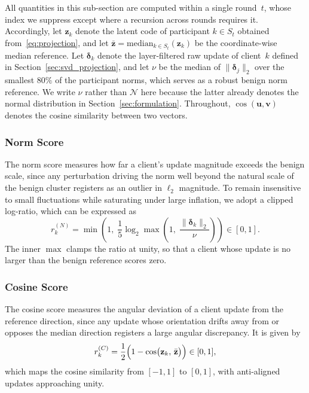 \documentclass[journal]{IEEEtran}
\begin{document}
All quantities in this sub-section are computed within a single round~$t$, whose index we suppress except where a recursion across rounds requires it. Accordingly, let $\mathbf{z}_k$ denote the latent code of participant $k \in S_t$ obtained from~\eqref{eq:projection}, and let $\bar{\mathbf{z}} = \mathrm{median}_{k \in S_t}(\mathbf{z}_k)$ be the coordinate-wise median reference. Let $\boldsymbol{\delta}_k$ denote the layer-filtered raw update of client~$k$ defined in Section~\ref{sec:svd_projection}, and let $\nu$ be the median of $\|\boldsymbol{\delta}_j\|_2$ over the smallest $80\%$ of the participant norms, which serves as a robust benign norm reference. We write $\nu$ rather than $\mathcal{N}$ here because the latter already denotes the normal distribution in Section~\ref{sec:formulation}. Throughout, $\cos(\mathbf{u},\mathbf{v})$ denotes the cosine similarity between two vectors.

\subsubsection{Norm Score}
The norm score measures how far a client's update magnitude exceeds the benign scale, since any perturbation driving the norm well beyond the natural scale of the benign cluster registers as an outlier in $\ell_2$ magnitude. To remain insensitive to small fluctuations while saturating under large inflation, we adopt a clipped log-ratio, which can be expressed as
\begin{equation}
r_k^{(N)} = \min\!\left(1,\; \frac{1}{5}\log_2 \max\!\left(1,\; \frac{\|\boldsymbol{\delta}_k\|_2}{\nu}\right)\right) \in [0,1].
\label{eq:norm_score}
\end{equation}
The inner $\max$ clamps the ratio at unity, so that a client whose update is no larger than the benign reference scores zero.

\subsubsection{Cosine Score}
The cosine score measures the angular deviation of a client update from the reference direction, since any update whose orientation drifts away from or opposes the median direction registers a large angular discrepancy. It is given by
\begin{equation}
r_k^{(C)} = \frac{1}{2}\Bigl(1 - \cos\bigl(\mathbf{z}_k,\, \bar{\mathbf{z}}\bigr)\Bigr) \in [0,1],
\label{eq:cos_score}
\end{equation}
which maps the cosine similarity from $[-1,1]$ to $[0,1]$, with anti-aligned updates approaching unity.
\end{document}
